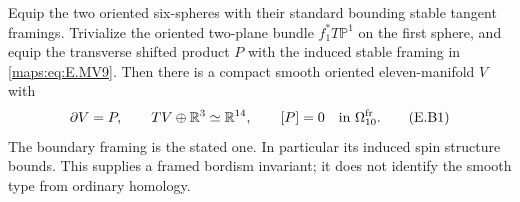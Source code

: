 \begin{proposition}\label{maps:src:E.2.8}


Equip the two oriented six-spheres with their standard bounding
stable tangent framings. Trivialize the oriented two-plane bundle
$f_1^*T\mathbb P^1$ on the first sphere, and equip the transverse
shifted product $P$ with the induced stable framing in \eqref{maps:eq:E.MV9}.
Then there is a compact smooth oriented eleven-manifold $V$ with
\[
 \partial V=P,\qquad TV\oplus\mathbb R^3\simeq\mathbb R^{14},
 \qquad [P]=0\quad\hbox{in }\Omega^{\mathrm{fr}}_{10}.
 \tag{E.B1}\label{maps:eq:E.B1}
\]
The boundary framing is the stated one. In particular its induced
spin structure bounds. This supplies a framed bordism invariant;
it does not identify the smooth type from ordinary homology.
\end{proposition}


